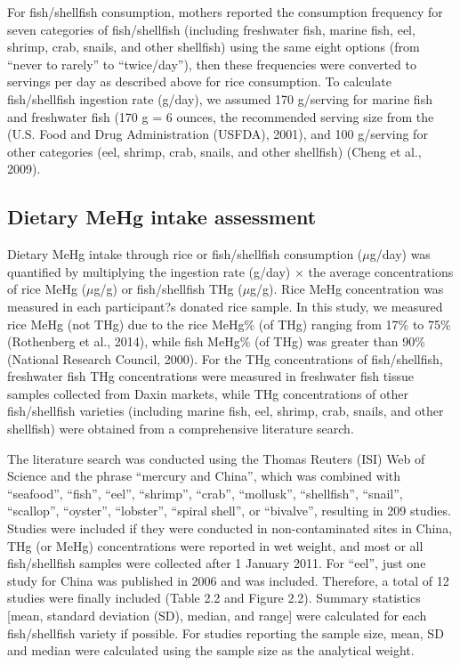 For fish/shellfish consumption, mothers reported the consumption frequency for seven categories of fish/shellfish (including freshwater fish, marine fish, eel, shrimp, crab, snails, and other shellfish) using the same eight options (from ``never to rarely'' to ``twice/day''), then these frequencies were converted to servings per day as described above for rice consumption. To calculate fish/shellfish ingestion rate (g/day), we assumed 170 g/serving for marine fish and freshwater fish (170 g = 6 ounces, the recommended serving size from the (U.S. Food and Drug Administration (USFDA), 2001), and 100 g/serving for other categories (eel, shrimp, crab, snails, and other shellfish) (Cheng et al., 2009). 

\subsection{Dietary MeHg intake assessment}

Dietary MeHg intake through rice or fish/shellfish consumption (\({\mu}\)g/day) was quantified by multiplying the ingestion rate (g/day) \({\times}\) the average concentrations of rice MeHg (\({\mu}\)g/g) or fish/shellfish THg (\({\mu}\)g/g). Rice MeHg concentration was measured in each participant?s donated rice sample. In this study, we measured rice MeHg (not THg) due to the rice MeHg\% (of THg) ranging from 17\% to 75\% (Rothenberg et al., 2014), while fish MeHg\% (of THg) was greater than 90\% (National Research Council, 2000). For the THg concentrations of fish/shellfish, freshwater fish THg concentrations were measured in freshwater fish tissue samples collected from Daxin markets, while THg concentrations of other fish/shellfish varieties (including marine fish, eel, shrimp, crab, snails, and other shellfish) were obtained from a comprehensive literature search. 

The literature search was conducted using the Thomas Reuters (ISI) Web of Science and the phrase ``mercury and China'', which was combined with ``seafood'', ``fish'', ``eel'', ``shrimp'', ``crab'', ``mollusk'', ``shellfish'', ``snail'', ``scallop'', ``oyster'', ``lobster'', ``spiral shell'', or ``bivalve'', resulting in 209 studies. Studies were included if they were conducted in non-contaminated sites in China, THg (or MeHg) concentrations were reported in wet weight, and most or all fish/shellfish samples were collected after 1 January 2011. For ``eel'', just one study for China was published in 2006 and was included. Therefore, a total of 12 studies were finally included (Table 2.2 and Figure 2.2). Summary statistics [mean, standard deviation (SD), median, and range] were calculated for each fish/shellfish variety if possible. For studies reporting the sample size, mean, SD and median were calculated using the sample size as the analytical weight. 

